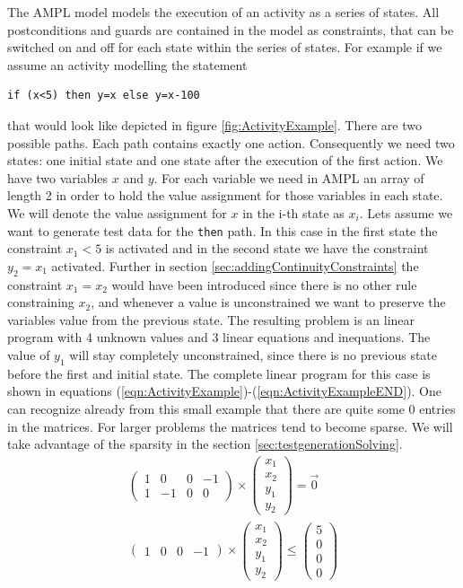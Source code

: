The AMPL model models the execution of an activity as a series of states. All postconditions and guards are contained in the model as constraints, that can be switched on and off for each state within the series of states. For example if we assume an activity modelling the statement \begin{verbatim}if (x<5) then y=x else y=x-100 \end{verbatim} that would look like depicted in figure \ref{fig:ActivityExample}. There are two possible paths. Each path contains exactly one action. Consequently we need two states: one initial state and one state after the execution of the first action. We have two variables $x$ and $y$. For each variable we need in AMPL an array of length 2 in order to hold the value assignment for those variables in each state. We will denote the value assignment for $x$ in the i-th state as $x_i$. Lets assume we want to generate test data for the \texttt{then} path. In this case in the first state the constraint $x_1<5$ is activated and in the second state we have the constraint $y_2=x_1$ activated. Further in section \ref{sec:addingContinuityConstraints} the constraint $x_1=x_2$ would have been introduced since there is no other rule constraining $x_2$, and whenever a value is unconstrained we want to preserve the variables value from the previous state. The resulting problem is an linear program with 4 unknown values and 3 linear equations and inequations. The value of $y_1$ will stay completely unconstrained, since there is no previous state before the first and initial state. The complete linear program for this case is shown in equations (\ref{eqn:ActivityExample})-(\ref{eqn:ActivityExampleEND}). One can recognize already from this small example that there are quite some 0 entries in the matrices. For larger problems the matrices tend to become sparse. We will take advantage of the sparsity in the section \ref{sec:testgenerationSolving}.
\begin{eqnarray}
\label{eqn:ActivityExample}
\begin{pmatrix} 1 & 0 & 0 & -1 \\ 1 & -1 & 0 & 0 \end{pmatrix} \times \begin{pmatrix} x_1 \\ x_2 \\ y_1 \\ y_2 \end{pmatrix} = \vec{0} \\
\begin{pmatrix} 1 & 0 & 0 & -1 \end{pmatrix} \times \begin{pmatrix} x_1 \\ x_2 \\ y_1 \\ y_2 \end{pmatrix} \leq \begin{pmatrix} 5 \\ 0 \\ 0 \\ 0 \end{pmatrix}
\label{eqn:ActivityExampleEND}
\end{eqnarray}
